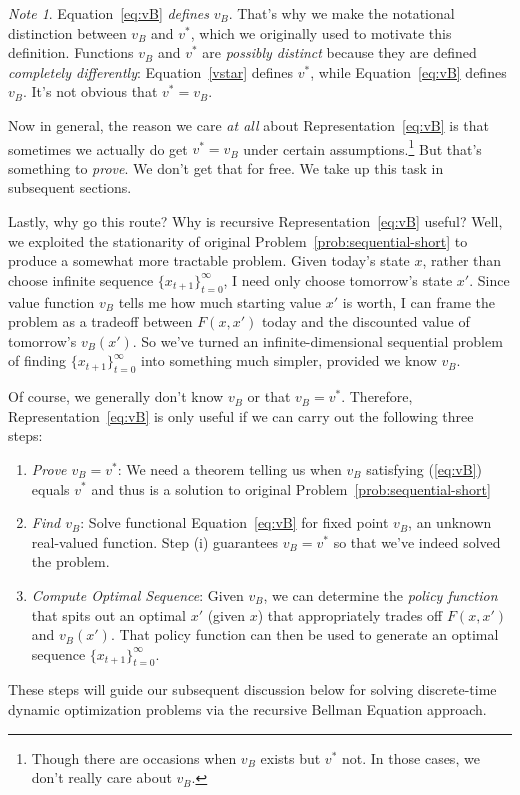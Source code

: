 \documentclass[12pt]{book}
\numberwithin{equation}{section} %
\theoremstyle{plain}
\theoremstyle{definition}
\theoremstyle{remark}
\newtheorem*{note}{Note}
\newcommand{\tinfz}{_{t=0}^\infty}
\begin{document}
\begin{note}
Equation~\ref{eq:vB} \emph{defines} $v_B$.
That's why we make the notational distinction between $v_B$ and $v^*$,
which we originally used to motivate this definition.
Functions $v_B$ and $v^*$ are \emph{possibly distinct} because
they are defined \emph{completely differently}:
Equation~\ref{vstar} defines $v^*$, while
Equation~\ref{eq:vB} defines $v_B$.
It's not obvious that $v^*=v_B$.

Now in general, the reason we care \emph{at all} about
Representation~\ref{eq:vB} is that sometimes we actually do get
$v^*=v_B$ under certain assumptions.\footnote{%
  Though there are occasions when $v_B$ exists but $v^*$ not.
  In those cases, we don't really care about $v_B$.
}
But that's something to \emph{prove}.  We don't get that for free.
We take up this task in subsequent sections.
\end{note}

Lastly, why go this route? Why is recursive
Representation~\ref{eq:vB} useful? Well, we exploited the stationarity
of original Problem~\ref{prob:sequential-short} to produce a
somewhat more tractable problem.  Given today's state $x$, rather than
choose infinite sequence $\{x_{t+1}\}_{t=0}^\infty$,
I need only choose tomorrow's state $x'$. Since value function $v_B$
tells me how much starting value $x'$ is worth, I can frame the
problem as a tradeoff between $F(x,x')$ today and the discounted value
of tomorrow's $v_B(x')$.  So we've turned an infinite-dimensional
sequential problem of finding $\{x_{t+1}\}^\infty_{t=0}$ into something
much simpler, provided we know $v_B$.

Of course, we generally don't know $v_B$ or that $v_B=v^*$.
Therefore, Representation~\ref{eq:vB} is only useful if we can carry
out the following three steps:
\begin{enumerate}[label=(\roman*)]
  \item
    \emph{Prove $v_B=v^*$}:
    We need a theorem telling us when $v_B$ satisfying (\ref{eq:vB})
    equals $v^*$ and thus is a solution to original
    Problem~\ref{prob:sequential-short}

  \item \emph{Find $v_B$}:
    Solve functional Equation~\ref{eq:vB} for fixed point $v_B$, an
    unknown real-valued function. Step (i) guarantees $v_B=v^*$ so that
    we've indeed solved the problem.

  \item \emph{Compute Optimal Sequence}:
    Given $v_B$, we can determine the \emph{policy function} that
    spits out an optimal $x'$ (given $x$) that appropriately trades off
    $F(x,x')$ and $v_B(x')$. That policy function can then be used to
    generate an optimal sequence $\{x_{t+1}\}\tinfz$.
\end{enumerate}
These steps will guide our subsequent discussion below for solving
discrete-time dynamic optimization problems via the recursive Bellman
Equation approach.
\end{document}
